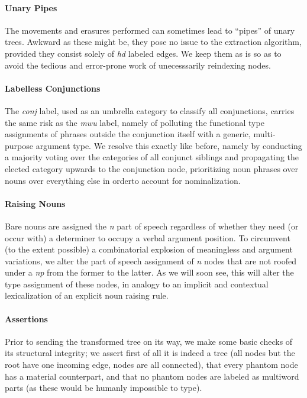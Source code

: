 \paragraph{Unary Pipes}
The movements and erasures performed can sometimes lead to ``pipes'' of unary trees.
Awkward as these might be, they pose no issue to the extraction algorithm, provided they consist solely of \textit{hd} labeled edges.
We keep them as is so as to avoid the tedious and error-prone work of unecesssarily reindexing nodes.

\paragraph{Labelless Conjunctions}
The \textit{conj} label, used as an umbrella category to classify all conjunctions, carries the same risk as the \textit{mwu} label, namely of polluting the functional type assignments of phrases outside the conjunction itself with a generic, multi-purpose argument type.
We resolve this exactly like before, namely by conducting a majority voting over the categories of all conjunct siblings and propagating the elected category upwards to the conjunction node, prioritizing noun phrases over nouns over everything else in orderto account for nominalization.

\paragraph{Raising Nouns}
Bare nouns are assigned the \textit{n} part of speech regardless of whether they need (or occur with) a determiner to occupy a verbal argument position.
To circumvent (to the extent possible) a combinatorial explosion of meaningless  and  argument variations, we alter the part of speech assignment of \textit{n} nodes that are not roofed under a \textit{np} from the former to the latter.
As we will soon see, this will alter the type assignment of these nodes, in analogy to an implicit and contextual lexicalization of an explicit noun raising rule.

\paragraph{Assertions}
Prior to sending the transformed tree on its way, we make some basic checks of its structural integrity; we assert first of all it is indeed a tree (all nodes but the root have one incoming edge, nodes are all connected), that every phantom node has a material counterpart, and that no phantom nodes are labeled as multiword parts (as these would be humanly impossible to type).

